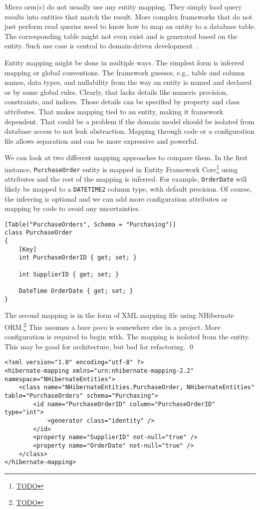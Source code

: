 Micro \acrshort{orm}(s) do not usually use any entity mapping. They simply load query results into entities that match the result. More complex frameworks that do not just perform read queries need to know how to map an entity to a database table. The corresponding table might not even exist and is generated based on the entity. Such use case is central to domain-driven development~\cite{FowlerDDD}.

Entity mapping might be done in multiple ways. The simplest form is inferred mapping or global conventions. The framework guesses, e.g., table and column names, data types, and nullability from the way an entity is named and declared or by some global rules. Clearly, that lacks details like numeric precision, constraints, and indices. Those details can be specified by property and class attributes. That makes mapping tied to an entity, making it framework dependent. That could be a problem if the domain model should be isolated from database access to not leak abstraction. Mapping through code or a configuration file allows separation and can be more expressive and powerful.

\begin{example}
\small
We can look at two different mapping approaches to compare them. In the first instance, \texttt{PurchaseOrder} entity is mapped in Entity Framework Core\footnote{\url{TODO}} using attributes and the rest of the mapping is inferred. For example, \texttt{OrderDate} will likely be mapped to a \texttt{DATETIME2} column type, with default precision. Of course, the inferring is optional and we can add more configuration attributes or mapping by code to avoid any uncertainties. 
\begin{lstlisting}[language=CSharp]
[Table("PurchaseOrders", Schema = "Purchasing")]
class PurchaseOrder
{
    [Key]
    int PurchaseOrderID { get; set; }

    int SupplierID { get; set; }

    DateTime OrderDate { get; set; }
}
\end{lstlisting}
The second mapping is in the form of XML mapping file using NHibernate ORM.\footnote{\url{TODO}} This assumes a bare \acrshort{poco} is somewhere else in a project.  More configuration is required to begin with. The mapping is isolated from the entity. This may be good for architecture, but bad for refactoring.
\qed
\begin{lstlisting}[language=CSharp]
<?xml version="1.0" encoding="utf-8" ?>
<hibernate-mapping xmlns="urn:nhibernate-mapping-2.2" namespace="NHibernateEntities">
    <class name="NHibernateEntities.PurchaseOrder, NHibernateEntities" table="PurchaseOrders" schema="Purchasing">
        <id name="PurchaseOrderID" column="PurchaseOrderID" type="int">
            <generator class="identity" />
        </id>
        <property name="SupplierID" not-null="true" />
        <property name="OrderDate" not-null="true" />
    </class>
</hibernate-mapping>
\end{lstlisting}
\end{example}

